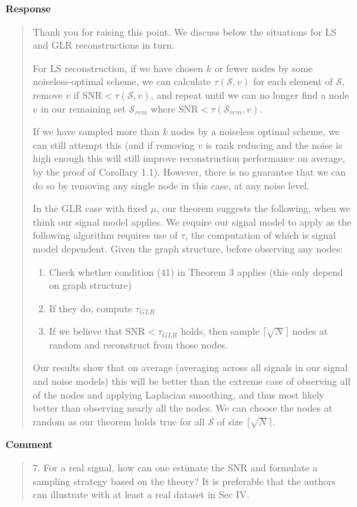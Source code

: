 \documentclass[11pt,onecolumn,journal]{IEEEtran}
\theoremstyle{definition}
\newcommand{\set}[1]{\mathcal{#1}}
\begin{document}
\textbf{Response}
\begin{quote}
Thank you for raising this point. We discuss below the situations for LS and GLR reconstructions in turn.

For LS reconstruction, if we have chosen $k$ or fewer nodes by some noiseless-optimal scheme, we can calculate $\tau(\set{S},v)$ for each element of $\set{S}$, remove $v$ if $\text{SNR} < \tau(\set{S},v)$, and repeat until we can no longer find a node $v$ in our remaining set $\set{S}_{rem}$ where $\text{SNR} < \tau(\set{S}_{rem},v)$.

If we have sampled more than $k$ nodes by a noiseless optimal scheme, we can still attempt this (and if removing $v$ is rank reducing and the noise is high enough this will still improve reconstruction performance on average, by the proof of Corollary 1.1). However, there is no guarantee that we can do so by removing any single node in this case, at any noise level.


In the GLR case with fixed $\mu$, our theorem suggests the following, when we think our signal model applies. We require our signal model to apply as the following algorithm requires use of $\tau$, the computation of which is signal model dependent. Given the graph structure, before observing any nodes:
\begin{enumerate}
    \item Check whether  condition (41) in Theorem 3 applies (this only depend on graph structure)
    \item If they do, compute $\tau_{GLR}$
    \item If we believe that $\text{SNR} < \tau_{GLR}$ holds, then sample $\lceil\sqrt{N}\rceil$ nodes at random and reconstruct from those nodes.
\end{enumerate}
Our results show that on average (averaging across all signals in our signal and noise models) this will be better than the extreme case of observing all of the nodes and applying Laplacian smoothing, and thus most likely better than observing nearly all the nodes. We can choose the nodes at random as our theorem holds true for all $\set{S}$ of size $\lceil\sqrt{N}\rceil$.

\end{quote}

\textbf{Comment}
\begin{quote}
7. For a real signal, how can one estimate the SNR and formulate a sampling strategy based on the theory? It is preferable that the authors can illustrate with at least a real dataset in Sec IV.
\end{quote}
\end{document}
